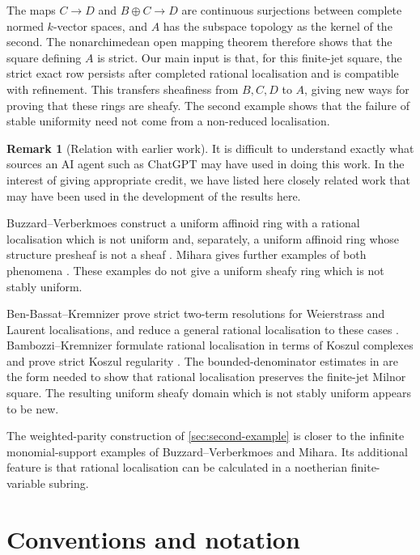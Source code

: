 \documentclass[11pt,reqno]{amsart}
\theoremstyle{definition}
\newtheorem{remark}[remark]{Remark}
\begin{document}
The maps $C\to D$ and $B\oplus C\to D$ are continuous surjections between
complete normed $k$-vector spaces, and $A$ has the subspace topology as the
kernel of the second.  The nonarchimedean open mapping theorem
\cite[Lemma~3.1]{KST} therefore shows that the square defining $A$ is strict.
Our main input is that,
for this finite-jet square, the strict exact row persists after completed rational
localisation and is compatible with refinement.  This transfers sheafiness from
$B,C,D$ to $A$, giving new ways for proving that these rings are sheafy.  The
second example shows that the failure of stable uniformity
need not come from a non-reduced localisation.

\begin{remark}[Relation with earlier work]\label{rem:earlier-work}
It is difficult to understand exactly what sources an AI agent such as
ChatGPT may have used in doing this work.  In the interest of giving
appropriate credit, we have listed here closely related work that may have
been used in the development of the results here.

Buzzard--Verberkmoes construct a uniform affinoid ring with a rational
localisation which is not uniform
and, separately, a uniform affinoid ring whose structure presheaf is not a
sheaf \cite[Propositions 17 and 18]{BV}.  Mihara gives further examples of both
phenomena \cite{Mihara}.  These examples do not give a uniform sheafy ring which is not
stably uniform.

Ben-Bassat--Kremnizer prove strict two-term resolutions
for Weierstrass and Laurent localisations, and reduce a general rational
localisation to these cases \cite[Lemmas~5.13--5.14]{BBK}.
Bambozzi--Kremnizer formulate rational localisation in terms of Koszul
complexes and prove strict Koszul regularity
\cite[Notation~4.3, Definitions~4.5--4.6, Proposition~4.9,
Lemma~4.11, and Corollary~4.13]{BK}.  The bounded-denominator estimates in
 are the form needed to show that rational localisation
preserves the finite-jet Milnor square.  The resulting uniform sheafy domain
which is not stably uniform appears to be new.

The weighted-parity construction of \cref{sec:second-example} is closer to the
infinite monomial-support examples of Buzzard--Verberkmoes and Mihara.  Its additional
feature is that rational localisation can be calculated in a noetherian
finite-variable subring.
\end{remark}


\section{Conventions and notation}\label{sec:conventions}
\end{document}
